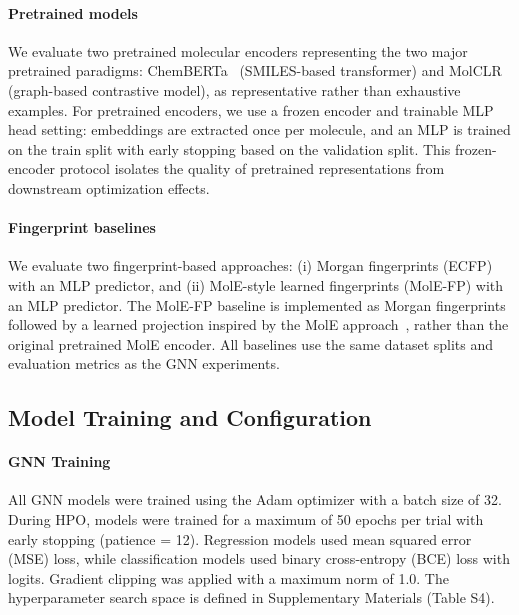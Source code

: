 \documentclass[journal]{IEEEtran}
\begin{document}
\paragraph{Pretrained models}
We evaluate two pretrained molecular encoders representing the two major pretrained paradigms: ChemBERTa~\cite{chemberta2} (SMILES-based transformer) and MolCLR~\cite{molclr} (graph-based contrastive model), as representative rather than exhaustive examples. For pretrained encoders, we use a frozen encoder and trainable MLP head setting: embeddings are extracted once per molecule, and an MLP is trained on the train split with early stopping based on the validation split. This frozen-encoder protocol isolates the quality of pretrained representations from downstream optimization effects.

\paragraph{Fingerprint baselines}
We evaluate two fingerprint-based approaches: (i) Morgan fingerprints (ECFP)~\cite{rogers2010ecfp} with an MLP predictor, and (ii) MolE-style learned fingerprints (MolE-FP) with an MLP predictor. The MolE-FP baseline is implemented as Morgan fingerprints followed by a learned projection inspired by the MolE approach~\cite{molE}, rather than the original pretrained MolE encoder. All baselines use the same dataset splits and evaluation metrics as the GNN experiments.

\subsection{Model Training and Configuration}
\label{sec:model_training}

\paragraph{GNN Training}
All GNN models were trained using the Adam optimizer with a batch size of 32. During HPO, models were trained for a maximum of 50 epochs per trial with early stopping (patience = 12). Regression models used mean squared error (MSE) loss, while classification models used binary cross-entropy (BCE) loss with logits. Gradient clipping was applied with a maximum norm of 1.0. The hyperparameter search space is defined in Supplementary Materials (Table S4).
\end{document}
